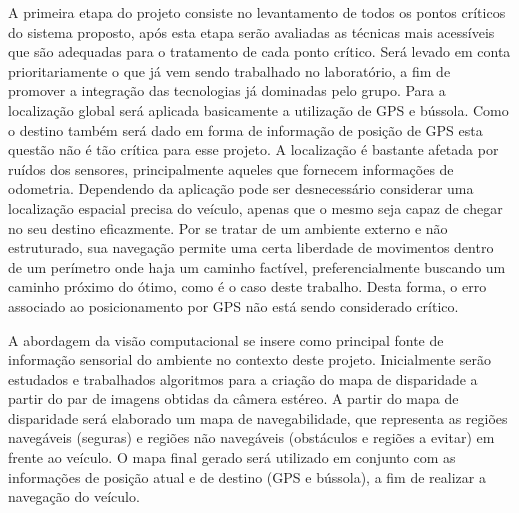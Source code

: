 
A primeira etapa do projeto consiste no levantamento de todos os pontos críticos
do sistema proposto, após esta etapa serão avaliadas as técnicas mais acessíveis
que são adequadas para o tratamento de cada ponto crítico. Será levado em conta
prioritariamente o que já vem sendo trabalhado no laboratório, a fim de promover
a integração das tecnologias já dominadas pelo grupo.
Para a localização global será aplicada basicamente a utilização de GPS e
bússola. Como o destino também será dado em forma de informação de posição de
GPS esta questão não é tão crítica para esse projeto. A localização é bastante
afetada por ruídos dos sensores, principalmente aqueles que fornecem informações
de odometria. Dependendo da aplicação pode ser desnecessário considerar uma
localização espacial precisa do veículo, apenas que o mesmo seja capaz de chegar
no seu destino eficazmente. Por se tratar de um ambiente externo e não
estruturado, sua navegação permite uma certa liberdade de movimentos dentro de
um perímetro onde haja um caminho factível, preferencialmente buscando um
caminho próximo do ótimo, como é o caso deste trabalho. Desta forma, o erro
associado ao posicionamento por GPS não está sendo considerado crítico.


A abordagem da visão computacional se insere como principal fonte de informação
sensorial do ambiente no contexto deste projeto. Inicialmente serão estudados e
trabalhados algoritmos para a criação do mapa de disparidade a partir do par de
imagens obtidas da câmera estéreo.
A partir do mapa de disparidade será elaborado um mapa de navegabilidade, que
representa as regiões navegáveis (seguras) e regiões não navegáveis (obstáculos
e regiões a evitar) em frente ao veículo. O mapa final gerado será utilizado em
conjunto com as informações de posição atual e de destino (GPS e bússola), a fim
de realizar a navegação do veículo.


